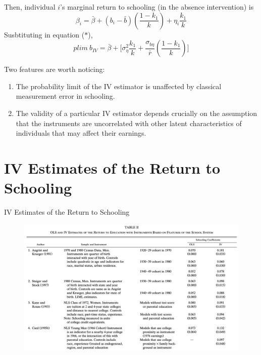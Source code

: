 \documentclass{beamer}
\begin{document}
\begin{frame}{}
Then, individual $i$'s marginal return to schooling (in the absence intervention) is
\begin{equation*}
    \beta_{i}= \bar{\beta} + (b_{i}-\bar{b})(\frac{1-k_{1}}{k}) + \eta_{i}\frac{k_{1}}{k}
\end{equation*}
    Susbtituting in equation ($\ast$), 
    \begin{equation*}
        plim ~b_{IV}= \bar{\beta} + \Bigg[ \sigma_{\eta}^{2} \frac{k_{1}}{k} + \frac{\sigma_{b \eta}}{\bar{r}}(\frac{1-k_{1}}{k})\Bigg]
    \end{equation*}
    
Two features are worth noticing: 
\begin{enumerate}
    \item The probability limit of the IV estimator is unaffected by classical measurement error in schooling. 
    \item The validity of a particular IV estimator depends crucially on the assumption that the instruments are uncorrelated with other latent characteristics of individuals that may affect their earnings.
\end{enumerate}
\end{frame}





\section{IV Estimates of the Return to Schooling}
\begin{frame}{IV Estimates of the Return to Schooling}
\begin{figure}
    \centering
    \includegraphics[scale= .42]{Table2.1.png}
\end{figure}
\end{frame}  
\end{document}
